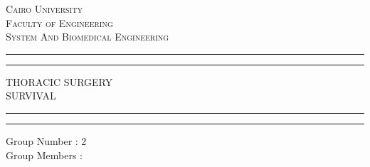 \documentclass[a4paper, 11pt, oneside]{article} %
\begin{document}
 




\begin{titlepage} %




	\centering %
	
	\scshape %
	
	\vspace*{\baselineskip} %
	\vspace{0.5\baselineskip} %
	
	{\scshape\Large Cairo University\\ Faculty of Engineering\\System And Biomedical Engineering\\} %

	
	\rule{\textwidth}{1.6pt}\vspace*{-\baselineskip}\vspace*{2pt} %
	\rule{\textwidth}{0.4pt} %
	
	\vspace{0.75\baselineskip} %
	
	{\LARGE THORACIC   SURGERY\\ SURVIVAL\\} %
	
	\vspace{0.75\baselineskip} %
	
	\rule{\textwidth}{0.4pt}\vspace*{-\baselineskip}\vspace{3.2pt} %
	\rule{\textwidth}{1.6pt} %
	
	\vspace{2\baselineskip} %
	
	
	
	Group Number : 2\\
         \vspace{2\baselineskip} 
        Group Members :
	

\end{titlepage}
\end{document}

